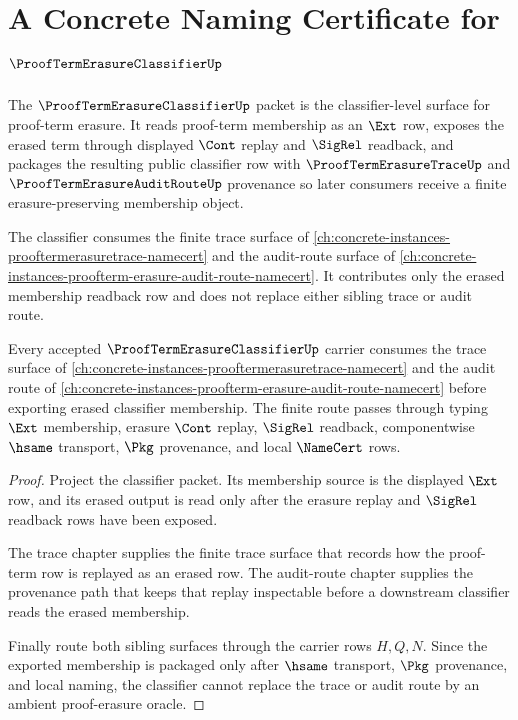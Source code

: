 \chapter{A Concrete Naming Certificate for $\ProofTermErasureClassifierUp$}
\label{ch:concrete-instances-proof-term-erasure-classifier-namecert}

The $\ProofTermErasureClassifierUp$ packet is the classifier-level surface for proof-term erasure. It reads proof-term membership as an $\Ext$ row, exposes the erased term through displayed $\Cont$ replay and $\SigRel$ readback, and packages the resulting public classifier row with $\ProofTermErasureTraceUp$ and $\ProofTermErasureAuditRouteUp$ provenance so later consumers receive a finite erasure-preserving membership object.

The classifier consumes the finite trace surface of \autoref{ch:concrete-instances-prooftermerasuretrace-namecert} and the audit-route surface of \autoref{ch:concrete-instances-proofterm-erasure-audit-route-namecert}. It contributes only the erased membership readback row and does not replace either sibling trace or audit route.

\begin{theorem}
\label{thm:proof-term-erasure-classifier-trace-sibling-route}
Every accepted $\ProofTermErasureClassifierUp$ carrier consumes the trace surface of \autoref{ch:concrete-instances-prooftermerasuretrace-namecert} and the audit route of \autoref{ch:concrete-instances-proofterm-erasure-audit-route-namecert} before exporting erased classifier membership. The finite route passes through typing $\Ext$ membership, erasure $\Cont$ replay, $\SigRel$ readback, componentwise $\hsame$ transport, $\Pkg$ provenance, and local $\NameCert$ rows.
\end{theorem}
\begin{proof}
Project the classifier packet. Its membership source is the displayed $\Ext$ row, and its erased output is read only after the erasure replay and $\SigRel$ readback rows have been exposed.

The trace chapter supplies the finite trace surface that records how the proof-term row is replayed as an erased row. The audit-route chapter supplies the provenance path that keeps that replay inspectable before a downstream classifier reads the erased membership.

Finally route both sibling surfaces through the carrier rows $H,Q,N$. Since the exported membership is packaged only after $\hsame$ transport, $\Pkg$ provenance, and local naming, the classifier cannot replace the trace or audit route by an ambient proof-erasure oracle.
\end{proof}

